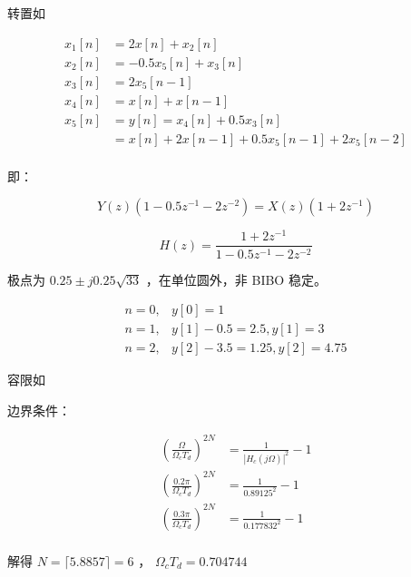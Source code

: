 \documentclass[lang=cn,11pt,a4paper,cite=authoryear,twocolumn]{elegantpaper}
\begin{document}


转置如  




\[\begin{aligned}
    x_1[n] &= 2 x[n] + x_2[n] \\ 
    x_2[n] &= -0.5 x_5[n] + x_3[n] \\ 
    x_3[n] &= 2 x_5[n-1] \\ 
    x_4[n] &= x[n] + x[n-1] \\ 
    x_5[n] &= y[n] = x_4[n] + 0.5 x_3[n] \\
    &= x[n] + 2 x[n-1] + 0.5 x_5[n-1] + 2 x_5[n-2] \\ 
\end{aligned}\]


即：

\[Y(z) (1 - 0.5 z^{-1} - 2 z^{-2}) = X(z) (1 + 2 z^{-1})\]

\[H(z) = \frac{1+2z^{-1}}{1 - 0.5 z^{-1} - 2z^{-2}}\] 

极点为 \(0.25 \pm j 0.25 \sqrt{33}\) ，在单位圆外，非 BIBO 稳定。


\[\begin{aligned}
    n = 0, & y[0] = 1 \\ 
    n = 1, & y[1] - 0.5 = 2.5, y[1] = 3 \\ 
    n = 2, & y[2] -3.5 = 1.25, y[2] = 4.75
\end{aligned}\]




容限如  


边界条件：

\[\begin{aligned}
    (\frac{\Omega}{\Omega_c T_d})^{2N} &= \frac{1}{|H_c(j\Omega)|^2} - 1 \\ 
    (\frac{0.2 \pi}{\Omega_c T_d})^{2N} &= \frac{1}{0.89125^2} - 1 \\ 
    (\frac{0.3\pi}{\Omega_c T_d})^{2N} &= \frac{1}{0.177832^2} - 1 \\ 
\end{aligned}\]


解得 \(N = \lceil 5.8857 \rceil = 6\) ， \(\Omega_c T_d = 0.704744\) 
\end{document}
